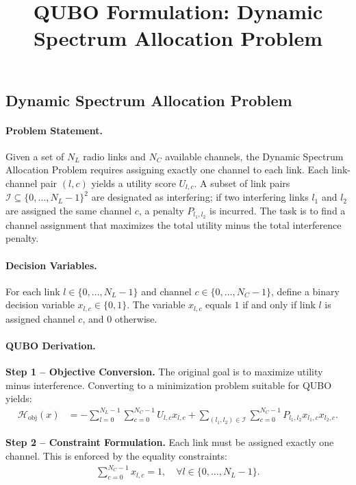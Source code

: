 \documentclass[12pt]{article}
\title{QUBO Formulation: Dynamic Spectrum Allocation Problem}
\date{}
\begin{document}
\maketitle

\subsection*{Dynamic Spectrum Allocation Problem}

\paragraph{Problem Statement.}
Given a set of $N_L$ radio links and $N_C$ available channels, the Dynamic Spectrum Allocation Problem requires assigning exactly one channel to each link. Each link-channel pair $(l,c)$ yields a utility score $U_{l,c}$. A subset of link pairs $\mathcal{I} \subseteq \{0,\dots,N_L-1\}^2$ are designated as interfering; if two interfering links $l_1$ and $l_2$ are assigned the same channel $c$, a penalty $P_{l_1,l_2}$ is incurred. The task is to find a channel assignment that maximizes the total utility minus the total interference penalty.

\paragraph{Decision Variables.}
For each link $l \in \{0, \dots, N_L-1\}$ and channel $c \in \{0, \dots, N_C-1\}$, define a binary decision variable $x_{l,c} \in \{0,1\}$. The variable $x_{l,c}$ equals $1$ if and only if link $l$ is assigned channel $c$, and $0$ otherwise.

\paragraph{QUBO Derivation.}
\textbf{Step 1 -- Objective Conversion.} The original goal is to maximize utility minus interference. Converting to a minimization problem suitable for QUBO yields:
\begin{align}
\mathcal{H}_{\text{obj}}(x) &= -\sum_{l=0}^{N_L-1} \sum_{c=0}^{N_C-1} U_{l,c} x_{l,c} + \sum_{(l_1,l_2) \in \mathcal{I}} \sum_{c=0}^{N_C-1} P_{l_1,l_2} x_{l_1,c} x_{l_2,c}.
\end{align}

\textbf{Step 2 -- Constraint Formulation.} Each link must be assigned exactly one channel. This is enforced by the equality constraints:
\begin{align}
\sum_{c=0}^{N_C-1} x_{l,c} = 1, \quad \forall l \in \{0, \dots, N_L-1\}.
\end{align}
\end{document}
